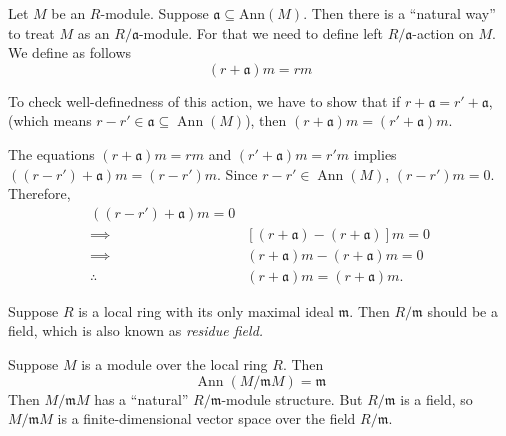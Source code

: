 \begin{remark}
    Let \(M\) be an  \(R\)-module. Suppose  \(\mathfrak{a} \subseteq \text{Ann}(M)\). Then there is a ``natural way'' to treat \(M\) as an  \(R/\mathfrak{a}\)-module. For that we need to define left \( R / \mathfrak{a} \)-action on \( M \). We define as follows
    \[
        (r + \mathfrak{a})m = rm
    \] 

    To check well-definedness of this action, we have to show that if \( r + \mathfrak{a} = r' + \mathfrak{a} \), (which means \( r - r' \in \mathfrak{a} \subseteq \operatorname{Ann}(M) \)), then \( (r + \mathfrak{a}) m = (r' + \mathfrak{a}) m\).

    The equations \( (r + \mathfrak{a})m = rm\) and \( (r' + \mathfrak{a})m = r'm\) implies \( ((r - r') + \mathfrak{a})m = (r-r')m\). Since \( r-r' \in \operatorname{Ann}(M) \),  \( (r - r')m = 0\). Therefore, 
     \begin{align*}
        ((r - r') + \mathfrak{a})m = 0\\
        \implies & [(r+\mathfrak{a}) - (r + \mathfrak{a})]m = 0\\
        \implies & (r + \mathfrak{a})m - (r + \mathfrak{a})m = 0\\
        \therefore \ & (r + \mathfrak{a})m = (r + \mathfrak{a})m 
    .\end{align*}
\end{remark}
\begin{remark}
    Suppose \( R \) is a local ring with its only maximal ideal  \( \mathfrak{m} \). Then \( R / \mathfrak{m} \) should be a field, which is also known as \textit{residue field.}

    Suppose \( M \) is a module over the local ring  \( R \). Then 
    \[
        \operatorname{Ann}(M / \mathfrak{m} M) = \mathfrak{m}
    \] 
    Then \( M / \mathfrak{m} M \) has a ``natural'' \( R / \mathfrak{m} \)-module structure. But \( R / \mathfrak{m} \) is a field, so \( M / \mathfrak{m} M\) is a finite-dimensional vector space over the field \( R / \mathfrak{m} \).
\end{remark}
